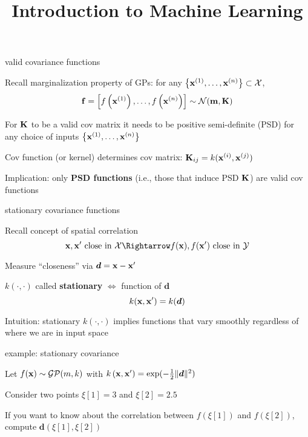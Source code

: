 \documentclass[11pt,compress,t,notes=noshow, xcolor=table]{beamer}
\title{Introduction to Machine Learning}
\begin{document}

\begin{framei}[sep=L]{valid covariance functions}
\item Recall marginalization property of GPs: for any $\xdat \subset \Xspace$,
$$\fv = \fvec \sim \gaussmk$$
\item For $\Kmat$ to be a valid cov matrix it needs to be positive semi-definite (PSD) for any choice of inputs $\xdat$
\item Cov function (or kernel) determines cov matrix: $\Kmat_{ij} = k(\xi, \xi[j])$
\item Implication: only \textbf{PSD functions} (i.e., those that induce PSD $\Kmat$) are valid cov functions
\end{framei}

\begin{framei}[sep=L]{stationary covariance functions}
\item Recall concept of spatial correlation
$$\xv, \xv^\prime \text{ close in } \Xspace \Rightarrow f(\xv), f(\xv^\prime) \text{ close in } \Yspace$$
\item Measure ``closeness'' via $\bm{d} = \xv - \xv^\prime$
\item $k(\cdot, \cdot)$ called \textbf{stationary} $\Leftrightarrow$ function of $\bm{d}$ 
$$k(\xv, \xv^\prime) = k(\bm{d})$$
\item Intuition: stationary $k(\cdot, \cdot)$ implies functions that vary smoothly regardless of where we are in input space
\end{framei}

\begin{framei}{example: stationary covariance}
\item Let $\fx \sim \mathcal{GP}(m, k)$ with $\kxxp = \exp(-\tfrac{1}{2}\|\bm{d}\|^2)$
\item Consider two points $\xi[1] = 3$ and $\xi[2] = 2.5$
\item If you want to know about the correlation between $f(\xi[1])$ and $f(\xi[2])$, compute $\bm{d}(\xi[1], \xi[2])$
\vfill
{}
\end{framei}
\end{document}
